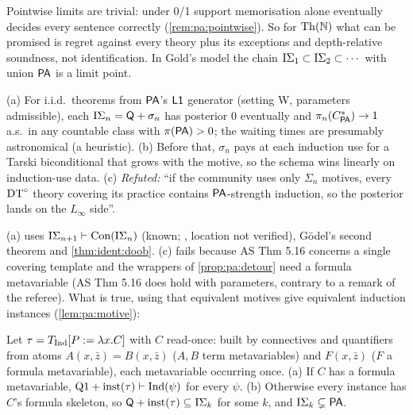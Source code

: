\noindent Pointwise limits are trivial: under 0/1 support memorisation alone eventually decides every sentence correctly (\cref{rem:pa:pointwise}). So for $\mathrm{Th}(\mathbb{N})$ what can be promised is regret against every theory plus its exceptions and depth-relative soundness, not identification. In Gold's model the chain $\mathrm{I}\Sigma_{1}\subset\mathrm{I}\Sigma_{2}\subset\cdots$ with union $\mathsf{PA}$ is a limit point.

\begin{proposition}\pabrk{}\label{prop:pa:isigma}
(a) For i.i.d.\ theorems from $\mathsf{PA}$'s $\mathord{\mathsf{L1}}$ generator (setting W, parameters admissible), each $\mathrm{I}\Sigma_{n}=\mathsf{Q}+\sigma_n$ has posterior $0$ eventually and $\pi_n(C^{*}_{\mathsf{PA}})\to1$ a.s.\ in any countable class with $\pi(\mathsf{PA})>0$; the waiting times are presumably astronomical (a heuristic). (b) Before that, $\sigma_n$ pays at each induction use for a Tarski biconditional that grows with the motive, so the schema wins linearly on induction-use data. (c) \emph{Refuted:} ``if the community uses only $\Sigma_n$ motives, every $\mathrm{DT}^{\circ}$ theory covering its practice contains $\mathsf{PA}$-strength induction, so the posterior lands on the $L_\infty$ side''.
\end{proposition}

\noindent (a) uses $\mathrm{I}\Sigma_{n+1}\vdash\mathrm{Con}(\mathrm{I}\Sigma_{n})$ (known; \citealp{hajek1993metamathematics}, location not verified), G\"odel's second theorem and \cref{thm:ident:doob}. (c) fails because AS Thm 5.16 concerns a single covering template and the wrappers of \cref{prop:pa:detour} need a formula metavariable (AS Thm 5.16 does hold with parameters, contrary to a remark of the referee). What is true, using that equivalent motives give equivalent induction instances (\cref{lem:pa:motive}):

\begin{proposition}\pabrk{}\label{prop:pa:readonce}
Let $\tau=T_{\mathrm{Ind}}[P:=\lambda x.C]$ with $C$ read-once: built by connectives and quantifiers from atoms $A(x,\bar z)=B(x,\bar z)$ ($A,B$ term metavariables) and $F(x,\bar z)$ ($F$ a formula metavariable), each metavariable occurring once. (a) If $C$ has a formula metavariable, $\mathrm{Q1}+\mathrm{inst}(\tau)\vdash\mathrm{Ind}(\psi)$ for every $\psi$. (b) Otherwise every instance has $C$'s formula skeleton, so $\mathsf{Q}+\mathrm{inst}(\tau)\subseteq\mathrm{I}\Sigma_{k}$ for some $k$, and $\mathrm{I}\Sigma_{k}\subsetneq\mathsf{PA}$.
\end{proposition}


